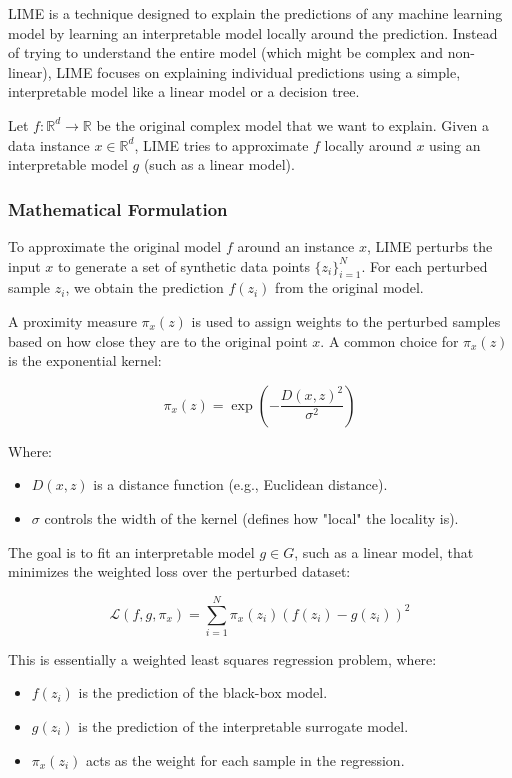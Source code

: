 \documentclass[conference,letterpaper]{IEEEtran}
\begin{document}
LIME is a technique designed to explain the predictions of any machine learning model by learning an interpretable model locally around the prediction. Instead of trying to understand the entire model (which might be complex and non-linear), LIME focuses on explaining individual predictions using a simple, interpretable model like a linear model or a decision tree.

Let \( f: \mathbb{R}^d \rightarrow \mathbb{R} \) be the original complex model that we want to explain. Given a data instance \( x \in \mathbb{R}^d \), LIME tries to approximate \( f \) locally around \( x \) using an interpretable model \( g \) (such as a linear model).

\subsubsection*{Mathematical Formulation}

To approximate the original model \( f \) around an instance \( x \), LIME perturbs the input \( x \) to generate a set of synthetic data points \( \{ z_i \}_{i=1}^N \). For each perturbed sample \( z_i \), we obtain the prediction \( f(z_i) \) from the original model.

A proximity measure \( \pi_x(z) \) is used to assign weights to the perturbed samples based on how close they are to the original point \( x \). A common choice for \( \pi_x(z) \) is the exponential kernel:

\[
\pi_x(z) = \exp\left(-\frac{D(x, z)^2}{\sigma^2}\right)
\]

Where:
\begin{itemize}
    \item \( D(x, z) \) is a distance function (e.g., Euclidean distance).
    \item \( \sigma \) controls the width of the kernel (defines how "local" the locality is).
\end{itemize}

The goal is to fit an interpretable model \( g \in G \), such as a linear model, that minimizes the weighted loss over the perturbed dataset:

\[
\mathcal{L}(f, g, \pi_x) = \sum_{i=1}^{N} \pi_x(z_i) \left(f(z_i) - g(z_i)\right)^2
\]

This is essentially a weighted least squares regression problem, where:
\begin{itemize}
    \item \( f(z_i) \) is the prediction of the black-box model.
    \item \( g(z_i) \) is the prediction of the interpretable surrogate model.
    \item \( \pi_x(z_i) \) acts as the weight for each sample in the regression.
\end{itemize}
\end{document}
